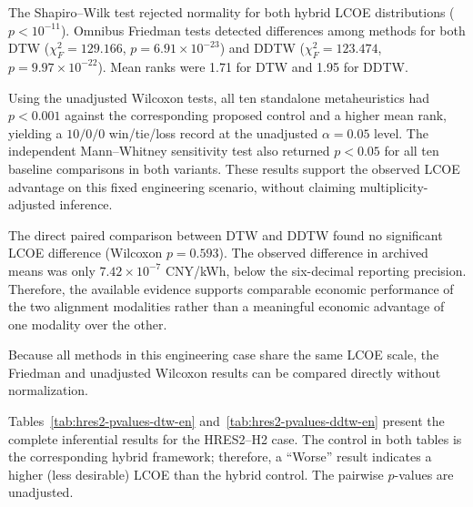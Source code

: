 The Shapiro--Wilk test rejected normality for both hybrid LCOE distributions
($p<10^{-11}$). Omnibus Friedman tests detected differences among methods for
both DTW ($\chi_F^2=129.166$, $p=6.91\times10^{-23}$) and DDTW
($\chi_F^2=123.474$, $p=9.97\times10^{-22}$). Mean ranks were 1.71 for DTW
and 1.95 for DDTW.

Using the unadjusted Wilcoxon tests, all ten standalone metaheuristics had
$p<0.001$ against the corresponding proposed control and a higher mean rank,
yielding a $10/0/0$ win/tie/loss record at the unadjusted $\alpha=0.05$ level.
The independent Mann--Whitney sensitivity test also returned $p<0.05$ for all
ten baseline comparisons in both variants. These results support the observed
LCOE advantage on this fixed engineering scenario, without claiming
multiplicity-adjusted inference.

The direct paired comparison between DTW and DDTW found no significant LCOE
difference (Wilcoxon $p=0.593$). The observed difference in archived means was
only $7.42\times10^{-7}$ CNY/kWh, below the six-decimal reporting precision.
Therefore, the available evidence supports comparable economic performance of
the two alignment modalities rather than a meaningful economic advantage of
one modality over the other.

Because all methods in this engineering case share the same LCOE scale, the
Friedman and unadjusted Wilcoxon results can be compared directly without
normalization.

Tables~\ref{tab:hres2-pvalues-dtw-en} and~\ref{tab:hres2-pvalues-ddtw-en}
present the complete inferential results for the HRES2--H2 case. The control
in both tables is the corresponding hybrid framework; therefore, a ``Worse''
result indicates a higher (less desirable) LCOE than the hybrid control. The
pairwise $p$-values are unadjusted.

